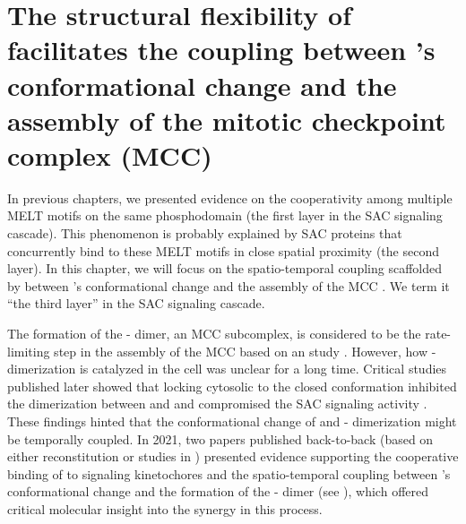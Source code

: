 \chapter{The structural flexibility of  facilitates the coupling between 's conformational change and the assembly of the mitotic checkpoint complex (MCC)}
\label{chpt:4}

In previous chapters, we presented evidence on the cooperativity among multiple MELT motifs on the same  phosphodomain (the first layer in the SAC signaling cascade). This phenomenon is probably explained by SAC proteins that concurrently bind to these MELT motifs in close spatial proximity (the second layer). In this chapter, we will focus on the spatio-temporal coupling scaffolded by  between 's conformational change and the assembly of the MCC \cite{BUB1-CDC20-MAD1,Tripartite}. We term it ``the third layer'' in the SAC signaling cascade. %

The formation of the - dimer, an MCC subcomplex, is considered to be the rate-limiting step in the assembly of the MCC based on an  study \cite{Faesen2017}. However, how - dimerization is catalyzed in the cell was unclear for a long time. Critical studies published later showed that locking cytosolic  to the closed conformation inhibited the dimerization between  and  and compromised the SAC signaling activity \cite{Ma+Poon2016,Ma+Poon2018,Kim2018}. These findings hinted that the conformational change of  and - dimerization might be temporally coupled. In 2021, two papers published back-to-back (based on either  reconstitution \cite{BUB1-CDC20-MAD1} or studies in  \cite{Tripartite}) presented evidence supporting the cooperative binding of  to signaling kinetochores and the spatio-temporal coupling between 's conformational change and the formation of the - dimer (see ), which offered critical molecular insight into the synergy in this process.


